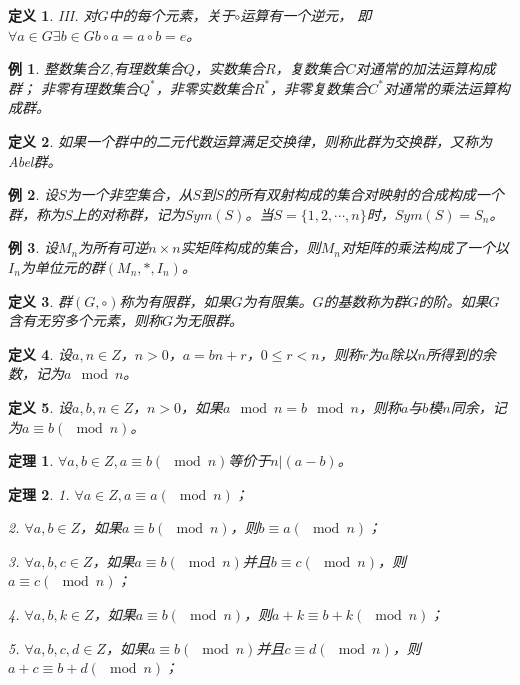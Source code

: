 \documentclass{article}
\newtheorem{Def}{定义}
\newtheorem{Thm}{定理}
\newtheorem*{Example}{例}
\begin{document}
\begin{CJK*}{UTF8}{gbsn}
\begin{Def}
  III. 对$G$中的每个元素，关于$\circ$运算有一个逆元，
  即$\forall a\in G \exists b\in G b\circ a = a\circ b= e$。
\end{Def}
\begin{Example}
  整数集合$Z$,有理数集合$Q$，实数集合$R$，复数集合$C$对通常的加法运算构成群；
  非零有理数集合$Q^*$，非零实数集合$R^*$，非零复数集合$C^*$对通常的乘法运算构成群。
\end{Example}
\begin{Def}
  如果一个群中的二元代数运算满足交换律，则称此群为交换群，又称为Abel群。
\end{Def}
\begin{Example}
设$S$为一个非空集合，从$S$到$S$的所有双射构成的集合对映射的合成构成一个群，称为$S$上的对称群，记为$Sym(S)$。当$S=\{1,2,\cdots,n\}$时，$Sym(S)=S_n$。
\end{Example}
  \begin{Example}
    设$M_n$为所有可逆$n\times n$实矩阵构成的集合，则$M_n$对矩阵的乘法构成了一个以$I_n$为单位元的群$(M_n,*,I_n)$。
  \end{Example}
\begin{Def}
  群$(G,\circ)$称为有限群，如果$G$为有限集。$G$的基数称为群$G$的阶。如果$G$含有无穷多个元素，则称$G$为无限群。
\end{Def}

\begin{Def}
  设$a,n\in Z$，$n>0$，$a=bn+r$，$0\leq r<n$，则称$r$为$a$除以$n$所得到的余数，记为$a\mod n$。
\end{Def}
\begin{Def}
  设$a,b,n\in Z$，$n>0$，如果$a\mod n=b\mod n$，则称$a$与$b$模$n$同余，记为$a \equiv b(\mod n)$。
\end{Def}

\begin{Thm}
  $\forall a,b\in Z, a\equiv b(\mod n)$等价于$n|(a-b)$。
\end{Thm}

\begin{Thm}
  1. $\forall a\in Z, a \equiv a (\mod n)$；

  2. $\forall a, b\in Z$，如果$a\equiv b (\mod n)$，则$b\equiv a(\mod n)$；

  3. $\forall a,b,c\in Z$，如果$a\equiv b(\mod n)$并且$b\equiv c(\mod n)$，则$a\equiv c(\mod n)$；

  4. $\forall a,b,k\in Z$，如果$a\equiv b(\mod n)$，则$a+k\equiv b+k(\mod n)$；

  5. $\forall a,b,c,d\in Z$，如果$a\equiv b(\mod n)$并且$c\equiv d(\mod n)$，则$a+c\equiv b+d (\mod n)$；


\end{Thm}
\end{CJK*}
\end{document}
